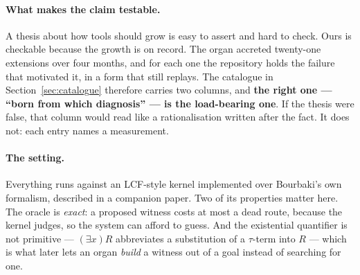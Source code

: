 \documentclass[11pt]{article}
\theoremstyle{remark}\newtheorem{remark}{Remark}
\begin{document}
\paragraph{What makes the claim testable.} A thesis about how tools should grow is easy
to assert and hard to check. Ours is checkable because the growth is on record. The
organ accreted twenty-one extensions over four months, and for each one the repository
holds the failure that motivated it, in a form that still replays. The catalogue in
Section~\ref{sec:catalogue} therefore carries two columns, and \textbf{the right one ---
``born from which diagnosis'' --- is the load-bearing one}. If the thesis were false,
that column would read like a rationalisation written after the fact. It does not: each
entry names a measurement.

\paragraph{The setting.} Everything runs against an LCF-style kernel implemented over
Bourbaki's own formalism, described in a companion paper. Two of its properties matter
here. The oracle is \emph{exact}: a proposed witness costs at most a dead route, because
the kernel judges, so the system can afford to guess. And the existential quantifier is
not primitive --- $(\exists x)R$ abbreviates a substitution of a $\tau$-term into $R$ ---
which is what later lets an organ \emph{build} a witness out of a goal instead of
searching for one.
\end{document}
